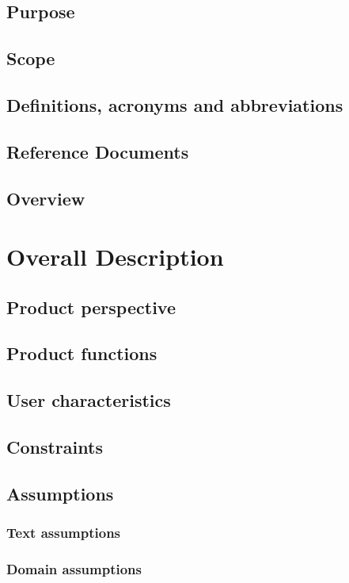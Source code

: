 \documentclass[11pt,a4paper]{report}
\begin{document}
\section{Purpose}
\section{Scope}
\section{Definitions, acronyms and abbreviations}
\section{Reference Documents}
\section{Overview}
\chapter{Overall Description}
\section{Product perspective}
\section{Product functions}
\section{User characteristics}
\section{Constraints}
\section{Assumptions}
\subsection{Text assumptions}
\subsection{Domain assumptions}
\end{document}

